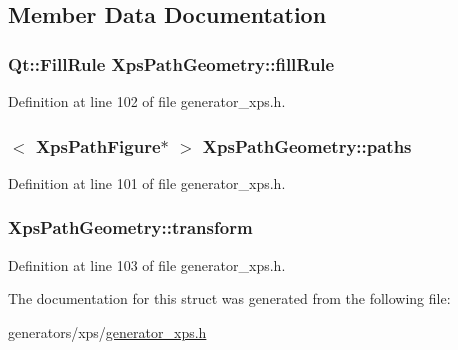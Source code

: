 \subsection{Member Data Documentation}
\hypertarget{structXpsPathGeometry_a5588ce9b578b7557dab8a31d04e09fef}{
\subsubsection[{fill\+Rule}]{\setlength{\rightskip}{0pt plus 5cm}Qt\+::\+Fill\+Rule Xps\+Path\+Geometry\+::fill\+Rule}}\label{structXpsPathGeometry_a5588ce9b578b7557dab8a31d04e09fef}


Definition at line 102 of file generator\+\_\+xps.\+h.

\hypertarget{structXpsPathGeometry_a2623aacaaadb1ac2b4c7cb2c5ded4b7b}{
\subsubsection[{paths}]{$<$ {\bf Xps\+Path\+Figure}$\ast$ $>$ Xps\+Path\+Geometry\+::paths}}\label{structXpsPathGeometry_a2623aacaaadb1ac2b4c7cb2c5ded4b7b}


Definition at line 101 of file generator\+\_\+xps.\+h.

\hypertarget{structXpsPathGeometry_a9ff5ab784e20e3a6fc70189f2bef8f72}{
\subsubsection[{transform}]{ Xps\+Path\+Geometry\+::transform}}\label{structXpsPathGeometry_a9ff5ab784e20e3a6fc70189f2bef8f72}


Definition at line 103 of file generator\+\_\+xps.\+h.



The documentation for this struct was generated from the following file\+:\begin{DoxyCompactItemize}
\item 
generators/xps/\hyperlink{generator__xps_8h}{generator\+\_\+xps.\+h}\end{DoxyCompactItemize}
